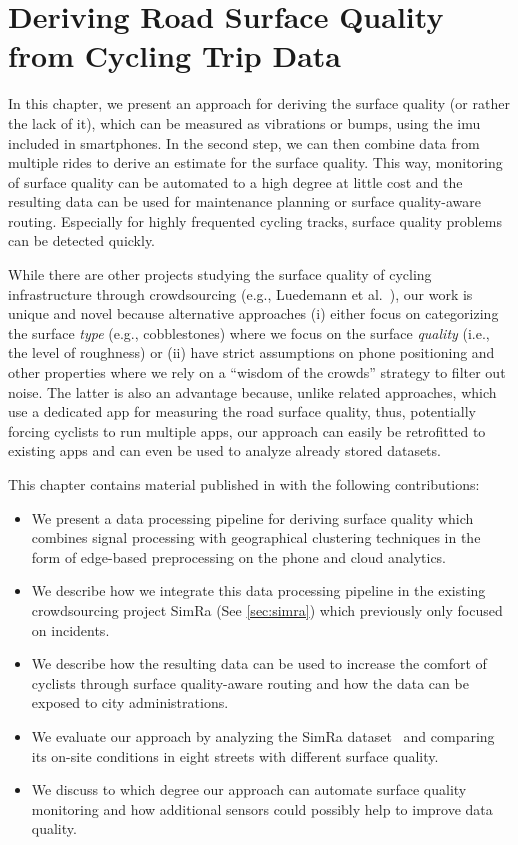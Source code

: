 \chapter{Deriving Road Surface Quality from Cycling Trip Data}
\label{cha:cyclequality}
In this chapter, we present an approach for deriving the surface quality (or rather the lack of it), which can be measured as vibrations or bumps, using the \ac{imu} included in smartphones.
In the second step, we can then combine data from multiple rides to derive an estimate for the surface quality.
This way, monitoring of surface quality can be automated to a high degree at little cost and the resulting data can be used for maintenance planning or surface quality-aware routing.
Especially for highly frequented cycling tracks, surface quality problems can be detected quickly.

While there are other projects studying the surface quality of cycling infrastructure through crowdsourcing (e.g., Luedemann et al.~\cite{luedemann2022bikevibes}), our work is unique and novel because alternative approaches (i) either focus on categorizing the surface \emph{type} (e.g., cobblestones) where we focus on the surface \emph{quality} (i.e., the level of roughness) or (ii) have strict assumptions on phone positioning and other properties where we rely on a ``wisdom of the crowds'' strategy to filter out noise.
The latter is also an advantage because, unlike related approaches, which use a dedicated app for measuring the road surface quality, thus, potentially forcing cyclists to run multiple apps, our approach can easily be retrofitted to existing apps and can even be used to analyze already stored datasets.

This chapter contains material published in \cite{karakaya2023crowdsensing} with the following contributions:
\begin{itemize}
	\item We present a data processing pipeline for deriving surface quality which combines signal processing with geographical clustering techniques in the form of edge-based preprocessing on the phone and cloud analytics.
	\item We describe how we integrate this data processing pipeline in the existing crowdsourcing project SimRa (See \ref{sec:simra}) which previously only focused on incidents.
	\item We describe how the resulting data can be used to increase the comfort of cyclists through surface quality-aware routing and how the data can be exposed to city administrations.
	\item We evaluate our approach by analyzing the SimRa dataset~\cite{dataset_simra_set1,dataset_simra_set2,dataset_simra_set3} and comparing its on-site conditions in eight streets with different surface quality.
	\item We discuss to which degree our approach can automate surface quality monitoring and how additional sensors could possibly help to improve data quality.
\end{itemize}

